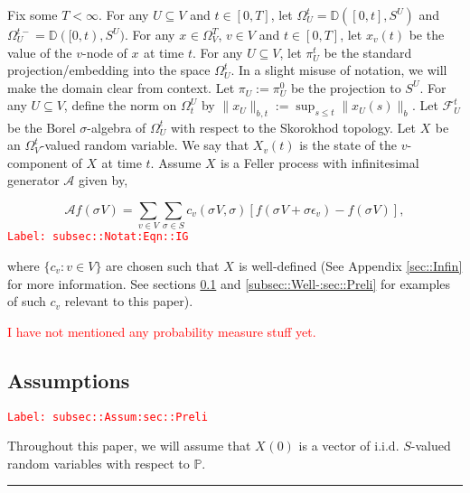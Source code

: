 \documentclass[12pt]{article}
\newcommand{\mb}{\mathbb}
\newcommand{\mc}{\mathcal}
\newcommand{\ep}{\epsilon}
\newcommand{\tr}{\textcolor{red}}
\newcommand{\labe}[1]{\tr{\texttt{Label: #1}}}
\newcommand{\ind}{\hspace{24pt}}
\newcommand{\lin}{\rule{\linewidth}{0.4 pt}}
\newcommand{\pr}{\mb{P}}							%
\newcommand{\defeq}{:=}								%
\newcommand{\cad}{\mb{D}}							%
\renewcommand{\v}{v}							%
\renewcommand{\U}{U}							%
\renewcommand{\S}{S}							%
\newcommand{\s}{\sigma}							%
\newcommand{\sv}[1]{\s^{#1}}					%
\renewcommand{\b}[1]{b_{#1}}					%
\newcommand{\ev}[1]{\ep_{#1}}					%
\newcommand{\T}{T}								%
\newcommand{\OmegaV}[2]{\Omega_{#1}^{#2}}		%
\renewcommand{\t}{t}							%
\newcommand{\IG}{\mc{A}}						%
\newcommand{\V}{V}									%
\renewcommand{\tt}{s}								%
\newcommand{\XState}[1]{\S^{#1}}				%
\newcommand{\piV}[2]{\pi_{#1}^{#2}}					%
\newcommand{\xvt}[2]{x_{#1}{(#2)}}					%
\newcommand{\rxvt}[2]{X_{#1}{(#2)}}					%
\newcommand{\xvts}[2]{x_{#1}{#2}}					%
\newcommand{\rxvts}[2]{X_{#1}{#2}}					%
\newcommand{\IGr}[1]{c_{#1}}						%
\newcommand{\F}[2]{\mc{F}_{#1}^{#2}}				%
\begin{document}
\ind Fix some \(\T < \infty\). For any \(\U\subseteq \V\) and \(\t\in [0,\T]\), let \(\OmegaV{\U}{\t} = \cad([0,\t],\S^{\U})\) and \(\OmegaV{\U}{\t-} = \cad([0,\t),\S^\U)\). For any \(\xvts{}{} \in \OmegaV{\V}{\T}\), \(\v\in \V\) and  \(\t \in [0,\T]\), let \(\xvt{\v}{\t}\) be the value of the \(\v\)-node of \(\xvts{}{}\) at time \(\t\). For any \(\U\subseteq \V\), let \(\piV{\U}{\t}\) be the standard projection/embedding into the space \(\OmegaV{\U}{\t}\). In a slight misuse of notation, we will make the domain clear from context. Let \(\piV{\U}{} \defeq \piV{\U}{0}\) be the projection to \(\S^\U\). For any \(\U\subseteq \V\), define the norm on \(\OmegaV{\t}{\U}\) by \(\|\xvts{\U}{}\|_{\b{},\t} \defeq \sup_{\tt \leq \t} \|\xvt{\U}{\tt}\|_{\b{}}\). Let \(\F{\U}{\t}\) be the Borel \(\sigma\)-algebra of \(\OmegaV{\U}{\t}\) with respect to the Skorokhod topology. Let \(\rxvts{}{}\) be an \(\OmegaV{\V}{\t}\)-valued random variable. We say that \(\rxvt{\v}{\t}\) is the state of the \(\v\)-component of \(\rxvts{}{}\) at time \(\t\). Assume \(\rxvts{}{}\) is a Feller process with infinitesimal generator \(\IG\) given by,

\begin{equation}
\IG f(\sv{}{\V}) = \sum_{\v \in \V}\sum_{\s \in \S} \IGr{\v}(\sv{}{\V},\s)[f(\sv{}{\V} + \s \ev{\v}) - f(\sv{}{\V})],
\label{subsec::Notat:Eqn::IG}
\end{equation}
\labe{subsec::Notat:Eqn::IG}

where \(\{\IGr{\v}:\v\in \V\}\) are chosen such that \(\rxvts{}{}\) is well-defined (See Appendix \ref{sec::Infin} for more information. See sections \ref{subsec::Assum:sec::Preli} and \ref{subsec::Well-:sec::Preli} for examples of such \(\IGr{\v}\) relevant to this paper). 

\tr{I have not mentioned any probability measure stuff yet.}

\subsection{Assumptions}
\label{subsec::Assum:sec::Preli}\labe{subsec::Assum:sec::Preli}

Throughout this paper, we will assume that \(\rxvt{}{0}\) is a vector of i.i.d. \(\S\)-valued random variables with respect to \(\pr\).

\lin
\end{document}
